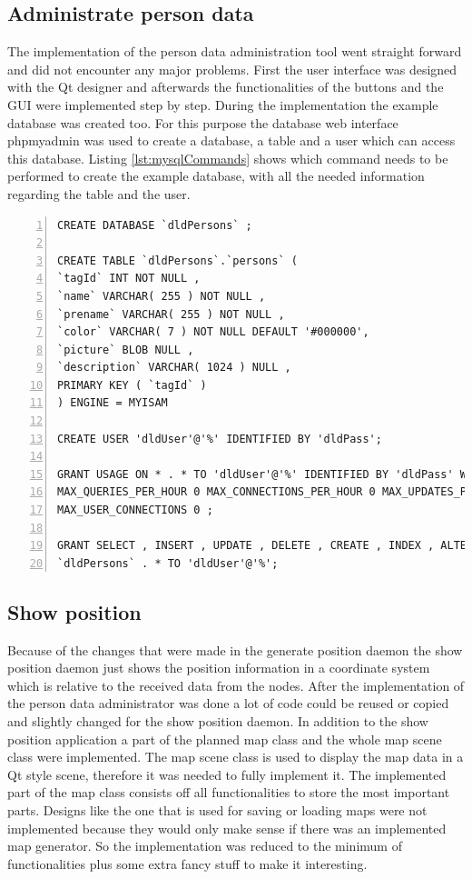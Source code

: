   \subsection{Administrate person data}
  \label{sec:implementation:pdAdmin}
   The implementation of the person data administration tool went straight forward and did not encounter any major problems. First the user interface was designed with the Qt designer and afterwards the functionalities of the buttons and the GUI were implemented step by step. During the implementation the example database was created too. For this purpose the database web interface phpmyadmin was used to create a database, a table and a user which can access this database. Listing \ref{lst:mysqlCommands} shows which command needs to be performed to create the example database, with all the needed information regarding the table and the user.
   \begin{lstlisting}[frame=single,breaklines,basicstyle=\footnotesize,numbers=left,label=lst:mysqlCommands,captionpos=b,caption={MySQL commands for creating the example database}]
CREATE DATABASE `dldPersons` ;

CREATE TABLE `dldPersons`.`persons` (
`tagId` INT NOT NULL ,
`name` VARCHAR( 255 ) NOT NULL ,
`prename` VARCHAR( 255 ) NOT NULL ,
`color` VARCHAR( 7 ) NOT NULL DEFAULT '#000000',
`picture` BLOB NULL ,
`description` VARCHAR( 1024 ) NULL ,
PRIMARY KEY ( `tagId` )
) ENGINE = MYISAM

CREATE USER 'dldUser'@'%' IDENTIFIED BY 'dldPass';

GRANT USAGE ON * . * TO 'dldUser'@'%' IDENTIFIED BY 'dldPass' WITH
MAX_QUERIES_PER_HOUR 0 MAX_CONNECTIONS_PER_HOUR 0 MAX_UPDATES_PER_HOUR 0
MAX_USER_CONNECTIONS 0 ;

GRANT SELECT , INSERT , UPDATE , DELETE , CREATE , INDEX , ALTER ON
`dldPersons` . * TO 'dldUser'@'%';
   \end{lstlisting}

  \subsection{Show position}
   Because of the changes that were made in the generate position daemon the show position daemon just shows the position information in a coordinate system which is relative to the received data from the nodes. After the implementation of the person data administrator was done a lot of code could be reused or copied and slightly changed for the show position daemon. In addition to the show position application a part of the planned map class and the whole map scene class were implemented. The map scene class is used to display the map data in a Qt style scene, therefore it was needed to fully implement it. The implemented part of the map class consists off all functionalities to store the most important parts. Designs like the one that is used for saving or loading maps were not implemented because they would only make sense if there was an implemented map generator. So the implementation was reduced to the minimum of functionalities plus some extra fancy stuff to make it interesting.
